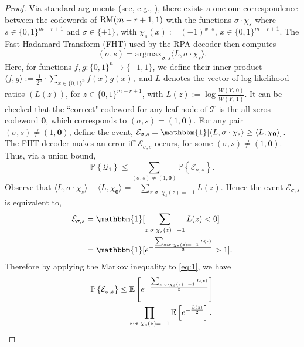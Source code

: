 \documentclass[conference,letterpaper]{IEEEtran}
\newcommand{\cE}{\ensuremath{\mathcal{E}}}
\newcommand{\cQ}{\ensuremath{\mathcal{Q}}}
\newcommand{\PR}[1]{{\mathbb{P}}\left\{ #1\right\}}
\newcommand{\E}[1]{\mathbb{E}\left[ #1\right]}
\newcommand{\argmax}{\mathrm{argmax}}
\newcommand{\indic}[1]{\mathbbm{1} [ #1] }
\begin{document}
\begin{proof}

Via standard arguments (see, e.g., \cite[Sec. IV-A]{rpa-analysis-isit}), there exists a one-one correspondence between the codewords of $\text{\normalfont RM}(m-r+1,1)$ with the functions 
$\sigma\cdot \chi_s$ where $s \in \{0,1\}^{m-r+1}$ and $\sigma \in \{\pm 1\}$, with $\chi_{{s}}({x}):=(-1)^{{x}\cdot {s}}$, ${x}\in \{0,1\}^{m-r+1}$.  
The Fast Hadamard Transform (FHT) used by the RPA decoder then computes
\begin{equation*}
    (\sigma, s) =\argmax_{\sigma, s} \langle L , \sigma\cdot \chi_s \rangle.
\end{equation*}
Here, for functions $f, g: \{0,1\}^n\to \{-1,1\}$, we define their inner product
$
\langle f,g\rangle:= \frac{1}{2^n}\cdot \sum_{{x}\in \{0,1\}^n} f({x})g({x}),
$
and $L$ denotes the vector of log-likelihood ratios $(L(z))$, for $z\in \{0,1\}^{m-r+1}$, with $L(z):=\log \frac{W(Y_z|0)}{W(Y_z|1)}$.
It can be checked that the ``correct" codeword for any leaf node of $\mathcal{T}$ is the all-zeros codeword $\mathbf{0}$, which corresponds to $(\sigma,s)= (1,\mathbf{0})$. For any pair $(\sigma,s)\neq ( 1 , \mathbf{0})$, define the event, $ \cE_{\sigma,s} = \indic{ \langle L,\sigma \cdot \chi_s \rangle\geq \langle L, \chi_{\mathbf{0}} \rangle  }$. The FHT decoder makes an error iff $ \cE_{\sigma,s}$ occurs, for some $(\sigma,s)\neq ( 1 , \mathbf{0})$. Thus, via a union bound, 
\begin{equation}
     \PR{ \cQ_1}  \leq   \sum_{(\sigma, s)\neq (1,\mathbf{0})}  \PR{ \cE_{\sigma,s} }. \label{eq:3}
\end{equation}
Observe that
$
\langle L , \sigma\cdot \chi_s \rangle - \langle L , \chi_{\mathbf{0}} \rangle
    = - \sum_{z : \sigma\cdot \chi_s(z) = -1} L(z).
$
Hence the event $ \cE_{\sigma ,s }$ is equivalent to, 
\begin{align}
\label{eq:1}
    \cE_{\sigma,s} & = \indic{ \sum_{z : \sigma\cdot \chi_s(z) = -1} L(z) < 0 } \nonumber \\
    & = \indic{ e^{- \frac{\sum_{z : \sigma\cdot \chi_s(z) = -1} L(z)}{2}} >  1}.
\end{align}
Therefore by applying the Markov inequality to \eqref{eq:1}, we have
\begin{align}
\PR{\cE_{\sigma,s}} &\leq \E{ e^{- \frac{\sum_{z : \sigma\cdot \chi_s(z) = -1} L(z)}{2}}} \notag\\ &= \prod_{z : \sigma\cdot \chi_s(z) = -1} \E{ e^{- \frac{ L(z)}{2}}}. \label{eq:2}
\end{align}

\end{proof}
\end{document}
